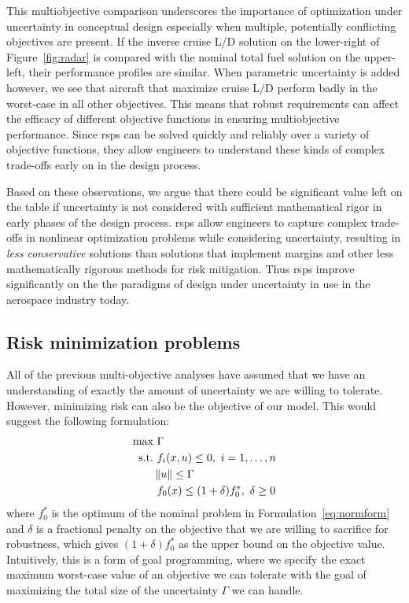 This multiobjective comparison underscores the importance of optimization under uncertainty
in conceptual design especially when multiple, potentially conflicting objectives are present.
If the inverse cruise L/D solution
on the lower-right of Figure~\ref{fig:radar} is compared with the nominal total fuel solution on the upper-left, their
performance profiles are similar. When parametric uncertainty is added however, we see that aircraft
that maximize cruise L/D perform badly in the worst-case
in all other objectives. This means that robust requirements can
affect the efficacy of different objective functions in ensuring multiobjective performance.
Since \gls{rsp}s can be solved quickly and reliably over a variety of objective functions,
they allow engineers to understand these kinds of complex trade-offs early on in the design process.

Based on these observations, we argue that there could be significant value left on the table
if uncertainty is not considered with sufficient mathematical rigor in early phases of
the design process. \gls{rsp}s allow engineers to capture complex
trade-offs in nonlinear optimization problems while considering uncertainty,
resulting in \emph{less conservative} solutions
than solutions that implement margins and other less mathematically
rigorous methods for risk mitigation.
Thus \gls{rsp}s improve significantly on the
the paradigms of design under uncertainty in use
in the aerospace industry today.

\subsection{Risk minimization problems}

All of the previous multi-objective analyses have assumed that we have an
understanding of exactly the amount of uncertainty we are
willing to tolerate. However, minimizing risk can also be the objective of our
model. This would suggest the following formulation:
\begin{equation}
    \begin{split}
    \text{max} &~\Gamma \\
    \text{s.t.}     &~f_i(x,u) \leq 0,~i = 1,\ldots,n \\
                    & \left\lVert u\right\rVert \leq \Gamma \\
                    &~f_0(x) \leq (1+\delta)f_0^*,~\delta \geq 0
    \end{split}
    \label{eq:goalprogramming}
\end{equation}
where $f_0^*$ is the optimum of the nominal problem in Formulation~\ref{eq:normform} and $\delta$
is a fractional penalty on the objective that we are willing to sacrifice for robustness, which
gives $(1+\delta)f_0^*$ as the upper bound on the objective value. Intuitively,
this is a form of goal programming,
where we specify the exact maximum worst-case value of an objective we can tolerate with
the goal of maximizing the total size of the uncertainty $\Gamma$ we can handle.

